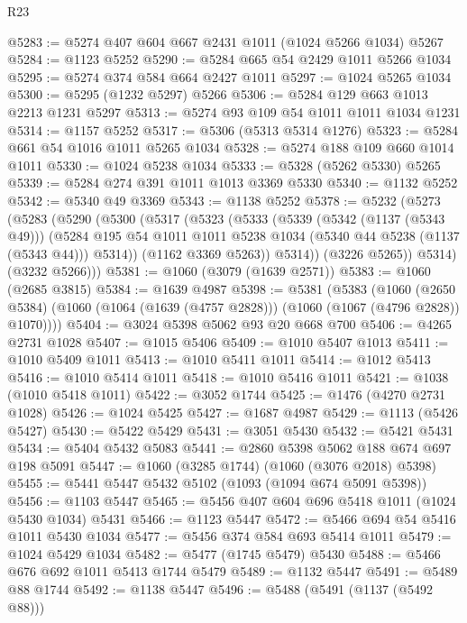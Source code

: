 \begin{lexlean}{R23}
\begin{coremodule}
@5283 := @5274 @407 @604 @667 @2431 @1011 (@1024 @5266 @1034) @5267
@5284 := @1123 @5252
@5290 := @5284 @665 @54 @2429 @1011 @5266 @1034
@5295 := @5274 @374 @584 @664 @2427 @1011
@5297 := @1024 @5265 @1034
@5300 := @5295 (@1232 @5297) @5266
@5306 := @5284 @129 @663 @1013 @2213 @1231 @5297
@5313 := @5274 @93 @109 @54 @1011 @1011 @1034 @1231
@5314 := @1157 @5252
@5317 := @5306 (@5313 @5314 @1276)
@5323 := @5284 @661 @54 @1016 @1011 @5265 @1034
@5328 := @5274 @188 @109 @660 @1014 @1011
@5330 := @1024 @5238 @1034
@5333 := @5328 (@5262 @5330) @5265
@5339 := @5284 @274 @391 @1011 @1013 @3369 @5330
@5340 := @1132 @5252
@5342 := @5340 @49 @3369
@5343 := @1138 @5252
@5378 := @5232
    (@5273
      (@5283
        (@5290
          (@5300
            (@5317
              (@5323
                (@5333
                  (@5339
                    (@5342 (@1137 (@5343 @49)))
                    (@5284
                      @195
                      @54
                      @1011
                      @1011
                      @5238
                      @1034
                      (@5340 @44 @5238 (@1137 (@5343 @44)))
                      @5314))
                  (@1162 @3369 @5263))
                @5314))
            (@3226 @5265))
          @5314)
        (@3232 @5266)))
@5381 := @1060 (@3079 (@1639 @2571))
@5383 := @1060 (@2685 @3815)
@5384 := @1639 @4987
@5398 := @5381
    (@5383
      (@1060
        (@2650 @5384)
        (@1060 (@1064 (@1639 (@4757 @2828))) (@1060 (@1067 (@4796 @2828)) @1070))))
@5404 := @3024 @5398 @5062 @93 @20 @668 @700
@5406 := @4265 @2731 @1028
@5407 := @1015 @5406
@5409 := @1010 @5407 @1013
@5411 := @1010 @5409 @1011
@5413 := @1010 @5411 @1011
@5414 := @1012 @5413
@5416 := @1010 @5414 @1011
@5418 := @1010 @5416 @1011
@5421 := @1038 (@1010 @5418 @1011)
@5422 := @3052 @1744
@5425 := @1476 (@4270 @2731 @1028)
@5426 := @1024 @5425
@5427 := @1687 @4987
@5429 := @1113 (@5426 @5427)
@5430 := @5422 @5429
@5431 := @3051 @5430
@5432 := @5421 @5431
@5434 := @5404 @5432 @5083
@5441 := @2860 @5398 @5062 @188 @674 @697 @198 @5091
@5447 := @1060 (@3285 @1744) (@1060 (@3076 @2018) @5398)
@5455 := @5441 @5447 @5432 @5102 (@1093 (@1094 @674 @5091 @5398))
@5456 := @1103 @5447
@5465 := @5456 @407 @604 @696 @5418 @1011 (@1024 @5430 @1034) @5431
@5466 := @1123 @5447
@5472 := @5466 @694 @54 @5416 @1011 @5430 @1034
@5477 := @5456 @374 @584 @693 @5414 @1011
@5479 := @1024 @5429 @1034
@5482 := @5477 (@1745 @5479) @5430
@5488 := @5466 @676 @692 @1011 @5413 @1744 @5479
@5489 := @1132 @5447
@5491 := @5489 @88 @1744
@5492 := @1138 @5447
@5496 := @5488 (@5491 (@1137 (@5492 @88)))

\end{coremodule}
\end{lexlean}
